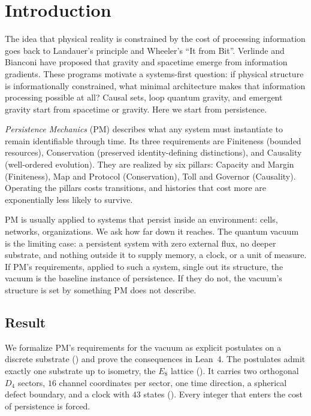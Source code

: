\section{Introduction}
\label{sec:introduction}

The idea that physical reality is constrained by the cost of processing information goes back to Landauer's principle\cite{landauer_irreversibility_1961} and Wheeler's ``It from Bit''\cite{wheeler_information_1989}. Verlinde\cite{verlinde_origin_2011} and Bianconi\cite{bianconi_thermodynamics_2025} have proposed that gravity and spacetime emerge from information gradients. These programs motivate a systems-first question: if physical structure is informationally constrained, what minimal architecture makes that information processing possible at all? Causal sets\cite{bombelli_space-time_1987}, loop quantum gravity\cite{rovelli_quantum_2004}, and emergent gravity\cite{verlinde_origin_2011,jacobson_thermodynamics_1995} start from spacetime or gravity. Here we start from persistence.

\textit{Persistence Mechanics}\cite{kate_meyer_persistence_2026} (PM) describes what any system must instantiate to remain identifiable through time. Its three requirements are Finiteness (bounded resources), Conservation (preserved identity-defining distinctions), and Causality (well-ordered evolution). They are realized by six pillars: Capacity and Margin (Finiteness), Map and Protocol (Conservation), Toll and Governor (Causality). Operating the pillars costs transitions, and histories that cost more are exponentially less likely to survive.

PM is usually applied to systems that persist inside an environment: cells, networks, organizations. We ask how far down it reaches. The quantum vacuum is the limiting case: a persistent system with zero external flux, no deeper substrate, and nothing outside it to supply memory, a clock, or a unit of measure. If PM's requirements, applied to such a system, single out its structure, the vacuum is the baseline instance of persistence. If they do not, the vacuum's structure is set by something PM does not describe.

\subsection{Result}
We formalize PM's requirements for the vacuum as explicit postulates on a discrete substrate () and prove the consequences in Lean~4. The postulates admit exactly one substrate up to isometry, the $E_8$ lattice (). It carries two orthogonal $D_4$ sectors, $16$ channel coordinates per sector, one time direction, a spherical defect boundary, and a clock with $43$ states (). Every integer that enters the cost of persistence is forced.

